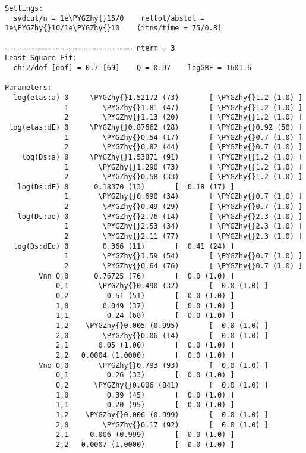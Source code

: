 \documentclass[letterpaper,10pt,english]{sphinxmanual}
\def\PYGZhy{\char`\-}
\begin{document}
\begin{Verbatim}[commandchars=\\\{\}]
Settings:
  svdcut/n = 1e\PYGZhy{}15/0    reltol/abstol = 1e\PYGZhy{}10/1e\PYGZhy{}10    (itns/time = 75/0.8)

============================== nterm = 3
Least Square Fit:
  chi2/dof [dof] = 0.7 [69]    Q = 0.97    logGBF = 1601.6

Parameters:
  log(etas:a) 0     \PYGZhy{}1.52172 (73)       [ \PYGZhy{}1.2 (1.0) ]  
              1        \PYGZhy{}1.81 (47)       [ \PYGZhy{}1.2 (1.0) ]  
              2        \PYGZhy{}1.13 (20)       [ \PYGZhy{}1.2 (1.0) ]  
 log(etas:dE) 0     \PYGZhy{}0.87662 (28)       [ \PYGZhy{}0.92 (50) ]  
              1        \PYGZhy{}0.54 (17)       [ \PYGZhy{}0.7 (1.0) ]  
              2        \PYGZhy{}0.82 (44)       [ \PYGZhy{}0.7 (1.0) ]  
    log(Ds:a) 0     \PYGZhy{}1.53871 (91)       [ \PYGZhy{}1.2 (1.0) ]  
              1       \PYGZhy{}1.290 (73)       [ \PYGZhy{}1.2 (1.0) ]  
              2        \PYGZhy{}0.58 (33)       [ \PYGZhy{}1.2 (1.0) ]  
   log(Ds:dE) 0      0.18370 (13)       [  0.18 (17) ]  
              1       \PYGZhy{}0.690 (34)       [ \PYGZhy{}0.7 (1.0) ]  
              2        \PYGZhy{}0.49 (29)       [ \PYGZhy{}0.7 (1.0) ]  
   log(Ds:ao) 0        \PYGZhy{}2.76 (14)       [ \PYGZhy{}2.3 (1.0) ]  
              1        \PYGZhy{}2.53 (34)       [ \PYGZhy{}2.3 (1.0) ]  
              2        \PYGZhy{}2.11 (77)       [ \PYGZhy{}2.3 (1.0) ]  
  log(Ds:dEo) 0        0.366 (11)       [  0.41 (24) ]  
              1        \PYGZhy{}1.59 (54)       [ \PYGZhy{}0.7 (1.0) ]  
              2        \PYGZhy{}0.64 (76)       [ \PYGZhy{}0.7 (1.0) ]  
        Vnn 0,0      0.76725 (76)       [  0.0 (1.0) ]  
            0,1       \PYGZhy{}0.490 (32)       [  0.0 (1.0) ]  
            0,2         0.51 (51)       [  0.0 (1.0) ]  
            1,0        0.049 (37)       [  0.0 (1.0) ]  
            1,1         0.24 (68)       [  0.0 (1.0) ]  
            1,2    \PYGZhy{}0.005 (0.995)       [  0.0 (1.0) ]  
            2,0        \PYGZhy{}0.06 (14)       [  0.0 (1.0) ]  
            2,1       0.05 (1.00)       [  0.0 (1.0) ]  
            2,2   0.0004 (1.0000)       [  0.0 (1.0) ]  
        Vno 0,0       \PYGZhy{}0.793 (93)       [  0.0 (1.0) ]  
            0,1         0.26 (33)       [  0.0 (1.0) ]  
            0,2      \PYGZhy{}0.006 (841)       [  0.0 (1.0) ]  
            1,0         0.39 (45)       [  0.0 (1.0) ]  
            1,1         0.20 (95)       [  0.0 (1.0) ]  
            1,2    \PYGZhy{}0.006 (0.999)       [  0.0 (1.0) ]  
            2,0        \PYGZhy{}0.17 (92)       [  0.0 (1.0) ]  
            2,1     0.006 (0.999)       [  0.0 (1.0) ]  
            2,2   0.0007 (1.0000)       [  0.0 (1.0) ]  


\end{Verbatim}
\end{document}
